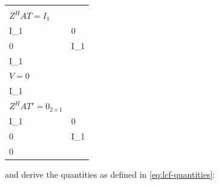 \documentclass[]{book}
\theoremstyle{definition}
\theoremstyle{definition}
\theoremstyle{definition}
\theoremstyle{remark}
\begin{document}
\begin{longtable}[]{@{}ll@{}}
\begin{minipage}[t]{0.34\columnwidth}
\end{minipage}\tabularnewline
\begin{minipage}[t]{0.16\columnwidth}\raggedright\strut
\(Z^HAT=I_1\)\strut
\end{minipage} & \begin{minipage}[t]{0.34\columnwidth}\raggedright\strut
\(\begin{bmatrix} 0 \\ I_1 \end{bmatrix}^H\begin{bmatrix} 0 & 0 \\ 0 & I_1 \end{bmatrix}\begin{bmatrix} 0 \\ I_1 \end{bmatrix}\)\strut
\end{minipage}\tabularnewline
\begin{minipage}[t]{0.16\columnwidth}\raggedright\strut
\(V=0\)\strut
\end{minipage} & \begin{minipage}[t]{0.34\columnwidth}\raggedright\strut
\(\corange (Z^HAT) = \kernel I_1^H\phantom{\begin{bmatrix} 0 \\ I_1 \end{bmatrix}}\)\strut
\end{minipage}\tabularnewline
\begin{minipage}[t]{0.16\columnwidth}\raggedright\strut
\(Z^HAT'=0_{2\times 1}\)\strut
\end{minipage} & \begin{minipage}[t]{0.34\columnwidth}\raggedright\strut
\(\begin{bmatrix} 0 \\ I_1 \end{bmatrix}^H\begin{bmatrix} 0 & 0 \\ 0 & I_1 \end{bmatrix}\begin{bmatrix} I_2 \\ 0 \end{bmatrix}\)\strut
\end{minipage}\tabularnewline
\bottomrule
\end{longtable}

and derive the quantities as defined in \eqref{eq:lcf-quantities}:
\end{document}
